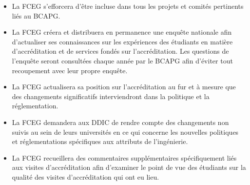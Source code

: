 \begin{itemize}
 \item La FCEG s'efforcera d'être incluse dans tous les projets et comités pertinents liés au BCAPG.
 \item La FCEG créera et distribuera en permanence une enquête nationale afin d'actualiser ses connaissances sur les expériences des étudiants en matière d'accréditation et de services fondés sur l'accréditation. Les questions de l'enquête seront consultées chaque année par le BCAPG afin d'éviter tout recoupement avec leur propre enquête.
 \item La FCEG actualisera sa position sur l'accréditation au fur et à mesure que des changements significatifs interviendront dans la politique et la réglementation.
 \item La FCEG demandera aux DDIC de rendre compte des changements non suivis au sein de leurs universités en ce qui concerne les nouvelles politiques et réglementations spécifiques aux attributs de l'ingénierie.
 \item La FCEG recueillera des commentaires supplémentaires spécifiquement liés aux visites d'accréditation afin d'examiner le point de vue des étudiants sur la qualité des visites d'accréditation qui ont eu lieu.
\end{itemize}

\newpage
